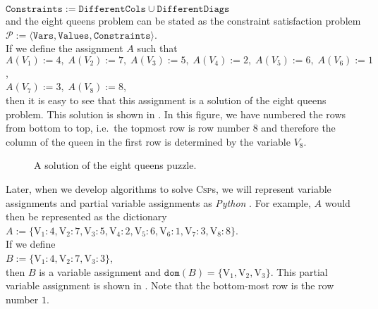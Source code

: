 $\texttt{Constraints} := \texttt{DifferentCols} \cup \texttt{DifferentDiags}$
\\[0.2cm]
and the eight queens problem can be stated as the constraint satisfaction problem
\\[0.2cm]
\hspace*{1.3cm}
$\mathcal{P} := \langle \texttt{Vars}, \texttt{Values}, \texttt{Constraints} \rangle$.
\\[0.2cm]
If we define the assignment $A$ such that
\\[0.2cm]
\hspace*{1.3cm}
$A(V_1) := 4,\; A(V_2) := 7,\; A(V_3) := 5,\; A(V_4) := 2,\; A(V_5) := 6,\; A(V_6) := 1$,
\\[0.2cm]
\hspace*{1.3cm}
$A(V_7) := 3,\; A(V_8) := 8$,
\\[0.2cm]
then it is easy to see that this assignment is a solution of the eight queens problem.  This solution is shown
in .  In this figure, we have numbered the rows from bottom to top, i.e.~the topmost
row is row number $8$ and therefore the column of the queen in the first row is determined by the variable $V_8$.

\begin{figure}[!ht]
  \centering
  \caption{A solution of the eight queens puzzle.}
  \label{fig:eight-queens.png}
\end{figure}

Later, when we develop algorithms to solve  \textsc{Csp}s, we will represent variable assignments and partial
variable assignments as \textsl{Python} .  For example, $A$ would then be represented as the
dictionary 
\\[0.2cm]
\hspace*{1.3cm}
$A := \bigl\{ \mathrm{V}_1:4, \mathrm{V}_2:7, \mathrm{V}_3:5, \mathrm{V}_4:2, 
             \mathrm{V}_5:6, \mathrm{V}_6:1, \mathrm{V}_7:3, \mathrm{V}_8:8 
      \bigr\}$.
\\[0.2cm]
If we define 
\\[0.2cm]
\hspace*{1.3cm}
$B := \bigl\{ \mathrm{V}_1:4, \mathrm{V}_2:7, \mathrm{V}_3:3 \bigr\}$,
\\[0.2cm]
then $B$ is a  variable assignment and $\texttt{dom}(B) = \{ \mathrm{V}_1, \mathrm{V}_2, \mathrm{V}_3 \}$.  This
partial variable assignment is shown in .  Note that the bottom-most row is the
row number $1$.


